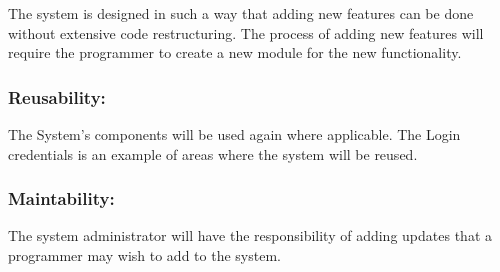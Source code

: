 \begin{flushleft}

The system is designed in such a way that adding new features can be done without extensive code restructuring. The process of adding new features will require the programmer to create a new module for the new functionality.

\end{flushleft}

\vspace{0.1in}

\vspace{0.2in}

\subsubsection{Reusability:}

\begin{flushleft}

The System's components will be used again where applicable. The Login credentials is an example of areas where the system will be reused.

\end{flushleft}

\vspace{0.1in}

\vspace{0.2in}

\subsubsection{Maintability:}

\begin{flushleft}
The system administrator will have the responsibility of adding updates that a programmer may wish to add to the system. 

\end{flushleft}

\vspace{0.1in}